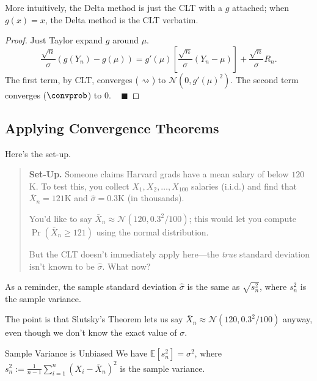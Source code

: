 More intuitively, the Delta method is just the CLT with a $g$ attached;
when $g(x) = x$, the Delta method is the CLT verbatim.

\begin{proof}
    Just Taylor expand $g$ around $\mu$.
    \[ \dfrac{\sqrt{n}}{\sigma} \left(g(Y_n) - g(\mu)\right)
    = g'(\mu)\left[\dfrac{\sqrt{n}}{\sigma}(Y_n - \mu)\right] +
    \dfrac{\sqrt{n}}{\sigma}R_n. \]
    The first term, by CLT, converges ($\rightsquigarrow$) to $\mathcal{N}(0, g'(\mu)^2)$.
    The second term converges ($\convprob$) to $0$. ~ $\blacksquare$
\end{proof}

\subsection{Applying Convergence Theorems}

Here's the set-up.

\begin{quote}
    \textbf{Set-Up.} Someone claims Harvard grads have a mean salary of below $120$K.
    To test this, you collect $X_1, X_2, \dots, X_{100}$ salaries (i.i.d.)
    and find that $\bar{X}_n = 121$K and $\hat{\sigma} = 0.3$K (in thousands).

    You'd like to say $\bar{X}_n \approx \mathcal{N}(120, 0.3^2/100)$;
    this would let you compute $\Pr(\bar{X}_n \geq 121)$ using the normal distribution.

    But the CLT doesn't immediately apply here---the \emph{true} standard
    deviation isn't known to be $\hat{\sigma}$.  What now?
\end{quote}

\begin{remark}
    As a reminder,
    the sample standard deviation $\hat{\sigma}$
    is the same as $\sqrt{s_n^2}$,
    where $s_n^2$ is the sample variance.
\end{remark}

The point is that Slutsky's Theorem lets us say
$\bar{X}_n \approx \mathcal{N}(120, 0.3^2/100)$
anyway, even though we don't know the exact value of $\sigma$.

\begin{theorem}{Sample Variance is Unbiased}
    We have $\mathbb{E}[s_n^2] = \sigma^2$, where
    $s_n^2 := \frac{1}{n - 1} \sum_{i = 1}^n (X_i - \bar{X}_n)^2$
    is the sample variance.
\end{theorem}

